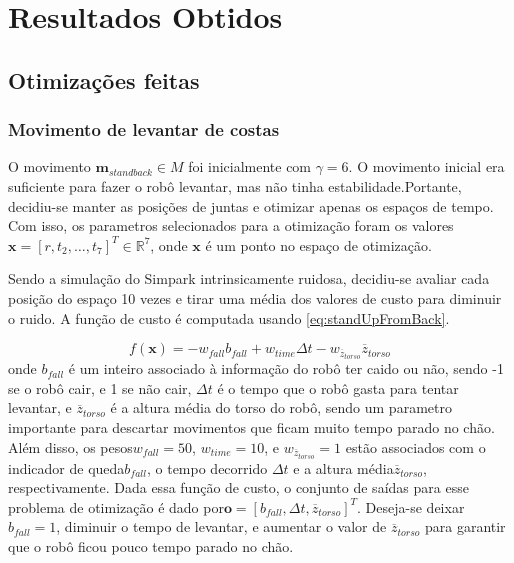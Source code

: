 \documentclass[
10pt, %
a4paper, %
oneside, %
headinclude,footinclude, %
BCOR5mm, %
]{scrartcl}
\begin{document}
	
	




\section{Resultados Obtidos}

\subsection{Otimizações feitas}
	
\subsubsection{Movimento de levantar de costas}

		O movimento $\mathrm{\mathbf{m}}_{standback} \in M$ foi inicialmente com $\gamma = 6$. O movimento inicial era suficiente para fazer o robô levantar, mas não tinha estabilidade.Portante, decidiu-se manter as posições de juntas e otimizar apenas os espaços de tempo. Com isso, os parametros selecionados para a otimização foram os valores $\mathrm{\mathbf{x}} = \left[ r, t_2, \dots, t_{7} \right]^T \in \mathbb{R}^7$, onde \( \mathrm{\mathbf{x}} \) é um ponto no espaço de otimização.

Sendo a simulação do Simpark intrinsicamente ruidosa, decidiu-se avaliar cada posição do espaço 10 vezes e tirar uma média dos valores de custo para diminuir o ruido. A função de custo é computada usando  \eqref{eq:standUpFromBack}.

\begin{equation} \label{eq:standUpFromBack}
f \left( \mathrm{\mathbf{x}} \right) = -w_{fall} b_{fall} + w_{time} \Delta t - w_{\overline{z}_{torso}} \overline{z}_{torso}
\end{equation}
onde \( b_{fall} \) é um inteiro associado à informação do robô ter caido ou não, sendo -1 se o robô cair, e 1 se não cair, \( \Delta t \) é o tempo que o robô gasta para tentar levantar, e \( \overline{z}_{torso} \) é a altura média do torso do robô, sendo um parametro importante para descartar movimentos que ficam muito tempo parado no chão. Além disso, os pesos\( w_{fall} = 50 \), \( w_{time} = 10\), e \( w_{\overline{z}_{torso}} =1\) estão associados com o indicador de queda\( b_{fall} \), o tempo decorrido \( \Delta t \) e a altura média\( \overline{z}_{torso} \), respectivamente. Dada essa função de custo, o conjunto de saídas para esse problema de otimização é dado por\( \mathrm{\mathbf{o}} = \left[ b_{fall}, \Delta t, \overline{z}_{torso}  \right]^T \). Deseja-se deixar \( b_{fall} = 1 \), diminuir o tempo de levantar, e aumentar o valor de \( \overline{z}_{torso} \) para garantir que o robô ficou pouco tempo parado no chão.
\end{document}
